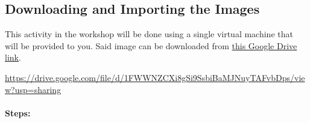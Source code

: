 \documentclass[letterpaper,12pt]{report}
\begin{document}
\newpage
\subsection*{Downloading and Importing the Images}

This activity in the workshop will be done using a single virtual machine that will be provided to you. Said image can be downloaded from \href{https://drive.google.com/file/d/1FWWNZCXi8gSi9SsbiBaMJNuyTAFvbDps/view?usp=sharing}{this Google Drive link}.

\url{https://drive.google.com/file/d/1FWWNZCXi8gSi9SsbiBaMJNuyTAFvbDps/view?usp=sharing}

\paragraph*{Steps:}
\end{document}

